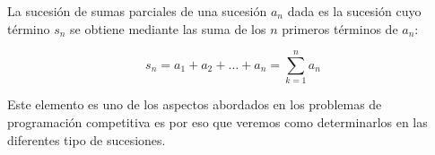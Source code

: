 La sucesión de sumas parciales de una sucesión $a_n$  dada es la sucesión cuyo término $s_n$ se obtiene mediante las suma de los $n$ primeros términos de $a_n$:

$$s_n = a_1 + a_2 + \dots + a_n = \sum_{k=1}^{n} a_n$$ 

Este elemento es uno de los aspectos abordados en los problemas de programación competitiva es por eso que veremos como determinarlos en las diferentes tipo de sucesiones.